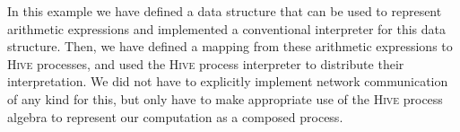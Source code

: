 In this example we have defined a data structure that can be used to represent arithmetic expressions and implemented a conventional interpreter for this data structure. Then, we have defined a mapping from these arithmetic expressions to \textsc{Hive} processes, and used the \textsc{Hive} process interpreter to distribute their interpretation. We did not have to explicitly implement network communication of any kind for this, but only have to make appropriate use of the \textsc{Hive} process algebra to represent our computation as a composed process. 